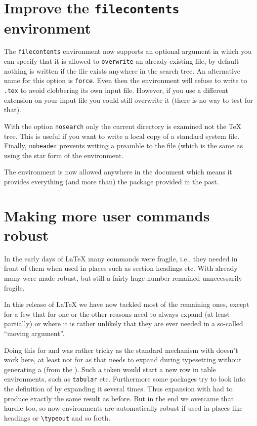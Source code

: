 \documentclass{ltnews}
\providecommand\option[1]{\texttt{#1}}
\providecommand\env[1]{\texttt{#1}}
\providecommand\env[1]{\texttt{#1}}
\begin{document}
\section{Improve the \env{filecontents} environment}

The \env{filecontents} environment now supports an optional argument
in which you can specify that it is allowed to \option{overwrite} an
already existing file, by default nothing is written if the file
exists anywhere in the search tree. An alternative name for this
option is \texttt{force}.  Even then the environment will refuse to write
to \texttt{.tex} to avoid clobbering its own input
file. However, if you use a different extension on your input file you
could still overwrite it (there is no way to test for that).

With the option \option{nosearch} only the current directory is
examined not the \TeX{} tree. This is useful if you want to write a
local copy of a standard system file.
Finally, \option{noheader} prevents writing a preamble to the file
(which is the same as using the star form of the environment.

The environment is now allowed anywhere in the document which means
it provides everything (and more than) the 
package provided in the past.



\section{Making more user commands robust}

In the early days of \LaTeX{} many commands were fragile, i.e., they
needed  in front of them when used in places such as
section headings etc. With \LaTeXe{} already many were made robust,
but still a fairly huge number remained unnecessarily fragile.

In this release of \LaTeX{} we have now tackled most of the remaining
ones, except for a few that for one or the other reasons need to
always expand (at least partially) or where it is rather unlikely that
they are ever needed in a so-called \enquote{moving argument}.

Doing this for  and  was rather tricky as the
standard mechanism with  doesn't work here,
at least not for  as that needs to expand during typesetting
without generating a  (from the ). Such a token
would start a new row in table environments, such as \texttt{tabular}
etc. Furthermore some packages try to look into the definition of
 by expanding it several times. Thus expansion with
 had to produce exactly the same result as before. But
in the end we overcame that hurdle too, so now environments are
automatically robust if used in places like headings or
\verb=\typeout= and so forth.
\end{document}
